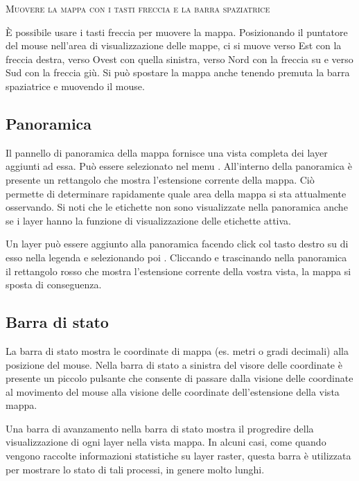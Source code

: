 \begin{Tip}\caption{\textsc{Muovere la mappa con i tasti freccia e la barra spaziatrice}}
È possibile usare i tasti freccia per muovere la mappa. Posizionando il puntatore del mouse 
nell'area di visualizzazione delle mappe, ci si muove verso Est con la freccia destra, 
verso Ovest con quella sinistra, verso Nord con la freccia su e verso Sud con la freccia giù. 
Si può spostare la mappa anche tenendo premuta la barra spaziatrice e
muovendo il mouse.
\end{Tip}

\subsection{Panoramica}\label{label_mapoverview}

Il pannello di panoramica della mappa fornisce una vista completa dei layer aggiunti ad essa. Può 
essere selezionato nel menu  \arrow {}.
All'interno della panoramica è presente un rettangolo che mostra l'estensione corrente della mappa. Ciò permette 
di determinare rapidamente quale area della mappa si sta attualmente osservando. Si noti 
che le etichette non sono visualizzate nella panoramica anche se i layer hanno la funzione di visualizzazione delle etichette attiva. 

Un layer può essere aggiunto alla panoramica facendo click col tasto destro su di 
esso nella legenda e selezionando poi . 
Cliccando e trascinando nella panoramica il rettangolo rosso che mostra l'estensione corrente della vostra vista, la mappa si sposta di conseguenza.

\subsection{Barra di stato}\label{label_statusbar}

La barra di stato mostra le coordinate di mappa (es. metri o gradi decimali) 
alla posizione del mouse. 
Nella barra di stato a sinistra del visore delle coordinate è presente un
piccolo pulsante che consente di passare dalla visione delle coordinate al
movimento del mouse alla visione delle coordinate dell'estensione della vista mappa.

Una barra di avanzamento nella barra di stato mostra il progredire della
visualizzazione di ogni layer nella vista mappa. In alcuni casi, come quando
vengono raccolte informazioni statistiche su layer raster, questa barra è
utilizzata per mostrare lo stato di tali processi, in genere molto lunghi. 


